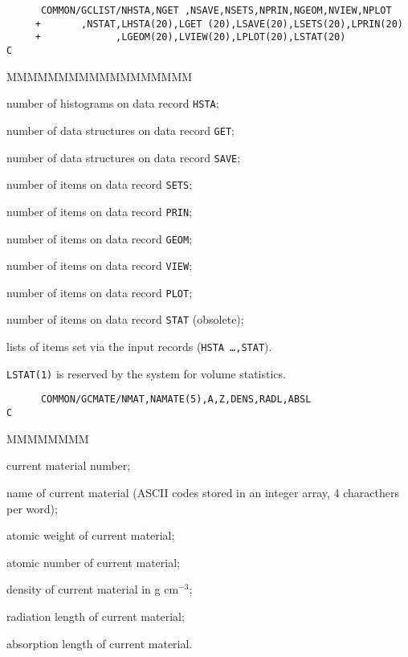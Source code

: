 \begin{verbatim}
      COMMON/GCLIST/NHSTA,NGET ,NSAVE,NSETS,NPRIN,NGEOM,NVIEW,NPLOT
     +       ,NSTAT,LHSTA(20),LGET (20),LSAVE(20),LSETS(20),LPRIN(20)
     +             ,LGEOM(20),LVIEW(20),LPLOT(20),LSTAT(20)
C
\end{verbatim}
\begin{DLtt}{MMMMMMMMMMMMMMMMMM}
\item[NHSTA] number of histograms on data record {\tt HSTA};
\item[NGET] number of data structures on data record {\tt GET};
\item[NSAVE]number of data structures on data record {\tt SAVE};
\item[NSETS]number of items on data record {\tt SETS};
\item[NPRIN]number of items on data record {\tt PRIN};
\item[NGEOM]number of items on data record {\tt GEOM};
\item[NVIEW]number of items on data record {\tt VIEW};
\item[NPLOT]number of items on data record {\tt PLOT};
\item[NSTAT]number of items on data record {\tt STAT} (obsolete);
\item[LHSTA \ldots LSTAT] lists of items set via the input records
({\tt HSTA \ldots,STAT}).
\end{DLtt}
{\tt LSTAT(1)} is reserved by the system for volume statistics.
\begin{verbatim}
      COMMON/GCMATE/NMAT,NAMATE(5),A,Z,DENS,RADL,ABSL
C
\end{verbatim}
\begin{DLtt}{MMMMMMMM}
\item[NMAT]  current material number;
\item[NAMATE]name of current material (ASCII codes stored in an integer
array, 4 characthers per word);
\item[A]atomic weight of current material;
\item[Z]atomic number of current material;
\item[DENS]density of current material in g cm$^{-3}$;
\item[RADL]radiation length of current material;
\item[ABSL]absorption length of current material.
\end{DLtt}
 
